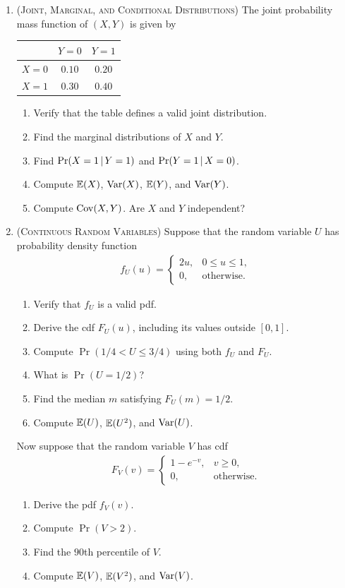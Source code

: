\documentclass[letterpaper,12pt]{article}
\begin{document}
\begin{enumerate}
	\item(\textsc{Joint, Marginal, and Conditional Distributions})
		The joint probability mass function of $(X,Y)$ is given by
		\begin{center}
			\begin{tabular}{c|cc}
				& $Y=0$ & $Y=1$ \\
				\hline
				$X=0$ & $0.10$ & $0.20$ \\
				$X=1$ & $0.30$ & $0.40$
			\end{tabular}
		\end{center}
		\begin{enumerate}
			\item
				Verify that the table defines a valid joint distribution.
			\item
				Find the marginal distributions of $X$ and $Y$.
			\item
				Find $\Pr(X=1\mathpunct{}|\mathpunct{} Y=1)$ and $\Pr(Y=1\mathpunct{}|\mathpunct{} X=0)$.
			\item
				Compute $\operatorname{\mathbb{E}}(X)$, $\operatorname{\text{\textrm{\upshape{Var}}}}(X)$, $\operatorname{\mathbb{E}}(Y)$, and $\operatorname{\text{\textrm{\upshape{Var}}}}(Y)$.
			\item
				Compute $\operatorname{\text{\textrm{\upshape{Cov}}}}(X,Y)$.
				Are $X$ and $Y$ independent?
		\end{enumerate}
	\item(\textsc{Continuous Random Variables})
		Suppose that the random variable $U$ has probability density function
		\begin{align}
			f_U(u)=
			\begin{cases}
				2u, & 0\leq u\leq 1,\\
				0, & \text{otherwise}.
			\end{cases}
		\end{align}
		\begin{enumerate}
			\item
				Verify that $f_U$ is a valid \gls{pdf}.
			\item
				Derive the \gls{cdf} $F_U(u)$, including its values outside $[0,1]$.
			\item
				Compute $\Pr(1/4<U\leq 3/4)$ using both $f_U$ and $F_U$.
			\item
				What is $\Pr(U=1/2)$?
			\item
				Find the median $m$ satisfying $F_U(m)=1/2$.
			\item
				Compute $\operatorname{\mathbb{E}}(U)$, $\operatorname{\mathbb{E}}(U^2)$, and $\operatorname{\text{\textrm{\upshape{Var}}}}(U)$.
		\end{enumerate}
		Now suppose that the random variable $V$ has \gls{cdf}
		\begin{align}
			F_V(v)=
			\begin{cases}
				1-e^{-v}, & v\geq 0, \\
				0, & \text{otherwise.}
			\end{cases}
		\end{align}
		\begin{enumerate}[resume]
			\item
				Derive the \gls{pdf} $f_V(v)$.
			\item
				Compute $\Pr(V>2)$.
			\item
				Find the $90$th percentile of $V$.
			\item
				Compute $\operatorname{\mathbb{E}}(V)$, $\operatorname{\mathbb{E}}(V^2)$, and $\operatorname{\text{\textrm{\upshape{Var}}}}(V)$.
		\end{enumerate}
\end{enumerate}
\end{document}
